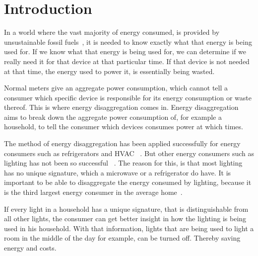 
\chapter{Introduction}
\label{chp:introduction}

\vspace{1\baselineskip}

\noindent


In a world where the vast majority of energy consumed, is provided by unsustainable fossil fuels~\cite{kolter2011redd}, it is needed to know exactly what that energy is being used for. 
If we know what that energy is being used for, we can determine if we really need it for that device at that particular time.
If that device is not needed at that time, the energy used to power it, is essentially being wasted.




Normal meters give an aggregate power consumption, which cannot tell a consumer which specific device is responsible for its energy consumption or waste thereof.
This is where energy disaggregation comes in.
Energy disaggregation aims to break down the aggregate power consumption of, for example a household, to tell the consumer which devices consumes power at which times.




The method of energy disaggregation has been applied successfully for energy consumers such as refrigerators and HVAC~\cite{kolter2011redd} \cite{spiegel2014energy}.
But other energy consumers such as lighting has not been so successful~\cite{spiegel2014energy} \cite{batra2015neighbourhood}.
The reason for this, is that most lighting has no unique signature, which a microwave or a refrigerator do have.
It is important to be able to disaggregate the energy consumed by lighting, because it is the third largest energy consumer in the average home~\cite{batra2015neighbourhood}.




If every light in a household has a unique signature, that is distinguishable from all other lights, the consumer can get better insight in how the lighting is being used in his household. 
With that information, lights that are being used to light a room in the middle of the day for example, can be turned off.
Thereby saving energy and costs.


















